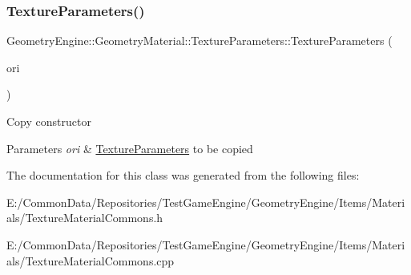 \subsubsection{\texorpdfstring{TextureParameters()}{TextureParameters()}\hspace{0.1cm}{\footnotesize\ttfamily [2/2]}}
{\footnotesize\ttfamily Geometry\+Engine\+::\+Geometry\+Material\+::\+Texture\+Parameters\+::\+Texture\+Parameters (\begin{DoxyParamCaption}\item[{const \mbox{\hyperlink{class_geometry_engine_1_1_geometry_material_1_1_texture_parameters}{Texture\+Parameters}} \&}]{ori }\end{DoxyParamCaption})}

Copy constructor 
\begin{DoxyParams}{Parameters}
{\em ori} & \mbox{\hyperlink{class_geometry_engine_1_1_geometry_material_1_1_texture_parameters}{Texture\+Parameters}} to be copied \\
\hline
\end{DoxyParams}


The documentation for this class was generated from the following files\+:\begin{DoxyCompactItemize}
\item 
E\+:/\+Common\+Data/\+Repositories/\+Test\+Game\+Engine/\+Geometry\+Engine/\+Items/\+Materials/Texture\+Material\+Commons.\+h\item 
E\+:/\+Common\+Data/\+Repositories/\+Test\+Game\+Engine/\+Geometry\+Engine/\+Items/\+Materials/Texture\+Material\+Commons.\+cpp\end{DoxyCompactItemize}
